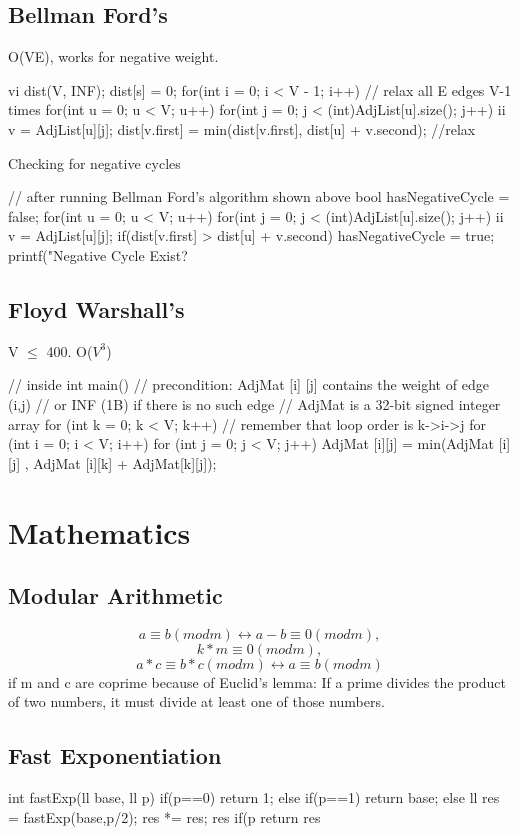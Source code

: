 \documentclass{article}
\begin{document}
\subsection{Bellman Ford's}
O(VE), works for negative weight.
\begin{mylisting}{}
vi dist(V, INF); dist[s] = 0;
for(int i = 0; i < V - 1; i++){		// relax all E edges V-1 times
	for(int u = 0; u < V; u++){
		for(int j = 0; j < (int)AdjList[u].size(); j++){
			ii v = AdjList[u][j];
			dist[v.first] = min(dist[v.first], dist[u] + v.second);	
		} //relax
	}
}
\end{mylisting}
\pagebreak
Checking for negative cycles
\begin{mylisting}{}
// after running Bellman Ford's algorithm shown above
bool hasNegativeCycle = false;
for(int u = 0; u < V; u++){
	for(int j = 0; j < (int)AdjList[u].size(); j++){
		ii v = AdjList[u][j];
		if(dist[v.first] > dist[u] + v.second)
			hasNegativeCycle = true;	
	}
}
printf("Negative Cycle Exist? %
\end{mylisting}

\subsection{Floyd Warshall's}
V $\leq$ 400. O(\(V^3\))
\begin{mylisting}{}
// inside int main()
// precondition: AdjMat [i] [j] contains the weight of edge (i,j)  
// or INF (1B) if there is no such edge
// AdjMat is a 32-bit signed integer array
for (int k = 0; k < V; k++) // remember that loop order is k->i->j
	for (int i = 0; i < V; i++)
		for (int j = 0; j < V; j++)
			AdjMat [i][j] = min(AdjMat [i][j] , AdjMat [i][k] + AdjMat[k][j]);
\end{mylisting}


\section{Mathematics}
\subsection{Modular Arithmetic}
\[ a \equiv b (mod m) \leftrightarrow a - b \equiv 0 (mod m),\]
\[k * m \equiv 0 (mod m),\]
\[a * c \equiv b * c (mod m) \leftrightarrow a \equiv b (mod m)\]
if m and c are coprime because of Euclid’s lemma: If a prime divides the product of two numbers, it must divide at least one of those numbers.
\subsection{Fast Exponentiation}
\begin{mylisting}{}
int fastExp(ll base, ll p){
	if(p==0) return 1;
	else if(p==1) return base;
	else{
		ll res = fastExp(base,p/2);
		res *= res;
		res %
		if(p%
		return res%
		}
}
\end{mylisting}
\end{document}
